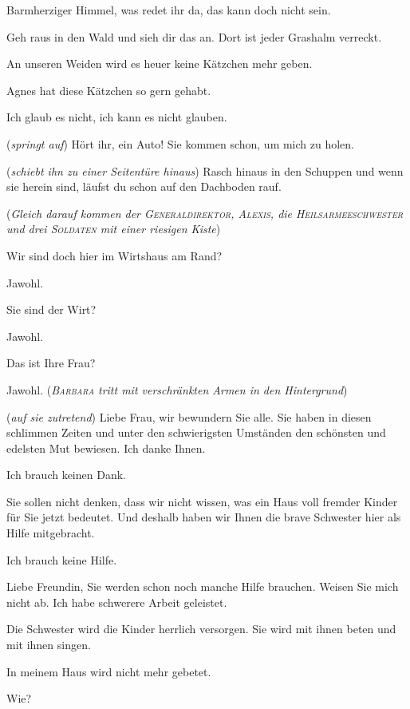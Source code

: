 \documentclass[
	final,
	a4paper,
	ngerman,
	mpinclude = true, %
	twoside = true,
	open = right,
	cleardoublepage = plain,
	DIV = 13,
	BCOR = 1cm,
	titlepage = firstiscover,
	]{scrbook}
\newcommand{\direction}[1]{(\textit{#1})}
\newcommand{\thecharacter}[1]{\textup{\textsc{#1}}\xspace}
\newcommand{\theBarbara}{\thecharacter{Barbara}}
\newcommand{\theJosef}{\thecharacter{Josef}}
\newcommand{\theAndreas}{\thecharacter{Andreas}}
\newcommand{\theGeneraldirektor}{\thecharacter{Generaldirektor}}
\newcommand{\theAlexis}{\thecharacter{Alexis}}
\newcommand{\theHeilsarmeeschwester}{\thecharacter{Heilsarmeeschwester}}
\newcommand{\theSoldaten}{\thecharacter{Soldaten}}
\newcommand{\character}[1]{\item[#1]}
\newcommand{\Barbara}{\character{\theBarbara}}
\newcommand{\Josef}{\character{\theJosef}}
\newcommand{\Andreas}{\character{\theAndreas}}
\newcommand{\Generaldirektor}{\character{Direktor}}
\newcommand{\Alexis}{\character{\theAlexis}}
\newcommand{\Heilsarmeeschwester}{\character{Schwester}}
\begin{document}
\begin{play}
\Josef
Barmherziger Himmel, was redet ihr da, das kann doch nicht sein.

\Andreas
Geh raus in den Wald und sieh dir das an. Dort ist jeder Grashalm verreckt.

\Barbara
An unseren Weiden wird es heuer keine Kätzchen mehr geben.

\Andreas
Agnes hat diese Kätzchen so gern gehabt.

\Josef
Ich glaub es nicht, ich kann es nicht glauben.

\Andreas
\direction{springt auf} Hört ihr, ein Auto! Sie kommen schon, um mich zu holen.

\Barbara \direction{schiebt ihn zu einer Seitentüre hinaus} Rasch hinaus in den Schuppen und wenn sie herein sind, läufst du schon auf den Dachboden rauf.

\direction{Gleich darauf kommen der \theGeneraldirektor, \theAlexis, die \theHeilsarmeeschwester und drei \theSoldaten mit einer riesigen Kiste}

\Generaldirektor
Wir sind doch hier im Wirtshaus am Rand?

\Josef
Jawohl.

\Alexis
Sie sind der Wirt?

\Josef
Jawohl.

\Alexis
Das ist Ihre Frau?

\Josef
Jawohl. \direction{\theBarbara tritt mit verschränkten Armen in den Hintergrund}

\Generaldirektor
\direction{auf sie zutretend} Liebe Frau, wir bewundern Sie alle. Sie haben in diesen schlimmen Zeiten und unter den schwierigsten Umständen den schönsten und edelsten Mut bewiesen. Ich danke Ihnen.

\Barbara
Ich brauch keinen Dank.

\Generaldirektor
Sie sollen nicht denken, dass wir nicht wissen, was ein Haus voll fremder Kinder für Sie jetzt bedeutet. Und deshalb haben wir Ihnen die brave Schwester hier als Hilfe mitgebracht.

\Barbara
Ich brauch keine Hilfe.

\Heilsarmeeschwester
Liebe Freundin, Sie werden schon noch manche Hilfe brauchen. Weisen Sie mich nicht ab. Ich habe schwerere Arbeit geleistet.

\Alexis
Die Schwester wird die Kinder herrlich versorgen. Sie wird mit ihnen beten und mit ihnen singen.

\Barbara
In meinem Haus wird nicht mehr gebetet.

\Heilsarmeeschwester
Wie?


\end{play}
\end{document}
